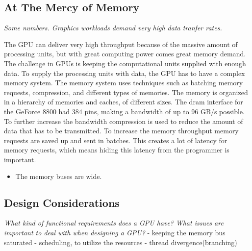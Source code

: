 \documentclass[../main/report.tex]{subfiles}
\begin{document}

\subsection{At The Mercy of Memory}


\textit{Some numbers. Graphics workloads demand very high data tranfer rates.}

The GPU can deliver very high throughput because of the massive amount of processing units, but with great computing power comes great memory demand.
The challenge in GPUs is keeping the computational units supplied with enough data.
To supply the processing units with data, the GPU has to have a complex memory system. 
The memory system uses techniques such as batching memory requests, compression, and different types of memories.
The memory is organized in a hierarchy of memories and caches, of different sizes.
The dram interface for the GeForce 8800 had 384 pins, making a bandwidth of up to 96 GB/s possible.
To further increase the bandwidth compression is used to reduce the amount of data that has to be transmitted.
To increase the memory throughput memory requests are saved up and sent in batches.
This creates a lot of latency for memory requests, which means hiding this latency from the programmer is important.
 
\begin{itemize}
	\item The memory buses are wide.
\end{itemize}


\subsection{Design Considerations}

\textit{What kind of functional requirements does a GPU have?}
\textit{What issues are important to deal with when designing a GPU?}
- keeping the memory bus saturated
- scheduling, to utilize the resources
- thread divergence(branching)
\end{document}
